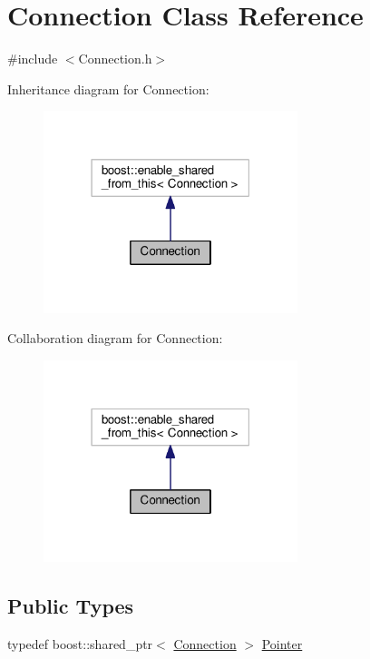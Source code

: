 \hypertarget{class_connection}{}\section{Connection Class Reference}
\label{class_connection}


{\ttfamily \#include $<$Connection.\+h$>$}



Inheritance diagram for Connection\+:
\nopagebreak
\begin{figure}[H]
\begin{center}
\leavevmode
\includegraphics[width=210pt]{class_connection__inherit__graph}
\end{center}
\end{figure}


Collaboration diagram for Connection\+:
\nopagebreak
\begin{figure}[H]
\begin{center}
\leavevmode
\includegraphics[width=210pt]{class_connection__coll__graph}
\end{center}
\end{figure}
\subsection*{Public Types}
\begin{DoxyCompactItemize}
\item 
typedef boost\+::shared\+\_\+ptr$<$ \hyperlink{class_connection}{Connection} $>$ \hyperlink{class_connection_afc73789251390ec9c9c6e3750b104f08}{Pointer}
\end{DoxyCompactItemize}
